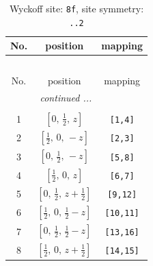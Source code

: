 \documentclass[fleqn,8pt]{jsarticle}
\begin{document}
\begin{longtable}{ccc}
\caption{Wyckoff site: {\tt 8f}, site symmetry: {\tt ..2}}
 \\
 \hline \hline
No. & position & mapping \\ \hline \endfirsthead

\multicolumn{2}{l}{\tablename\ \thetable{}} \\
 \hline \hline
No. & position & mapping \\ \hline \endhead

 \hline \hline
\multicolumn{2}{r}{\footnotesize\it continued ...} \\ \endfoot

 \hline \hline
\multicolumn{2}{r}{} \\ \endlastfoot

1 & $\left[ 0,\, \frac{1}{2},\, z \right]$ & {\tt [1,4]} \\ \hline
2 & $\left[ \frac{1}{2},\, 0,\, - z \right]$ & {\tt [2,3]} \\ \hline
3 & $\left[ 0,\, \frac{1}{2},\, - z \right]$ & {\tt [5,8]} \\ \hline
4 & $\left[ \frac{1}{2},\, 0,\, z \right]$ & {\tt [6,7]} \\ \hline
5 & $\left[ 0,\, \frac{1}{2},\, z + \frac{1}{2} \right]$ & {\tt [9,12]} \\ \hline
6 & $\left[ \frac{1}{2},\, 0,\, \frac{1}{2} - z \right]$ & {\tt [10,11]} \\ \hline
7 & $\left[ 0,\, \frac{1}{2},\, \frac{1}{2} - z \right]$ & {\tt [13,16]} \\ \hline
8 & $\left[ \frac{1}{2},\, 0,\, z + \frac{1}{2} \right]$ & {\tt [14,15]} \\
\end{longtable}
\renewcommand{\arraystretch}{1.2}
\end{document}
